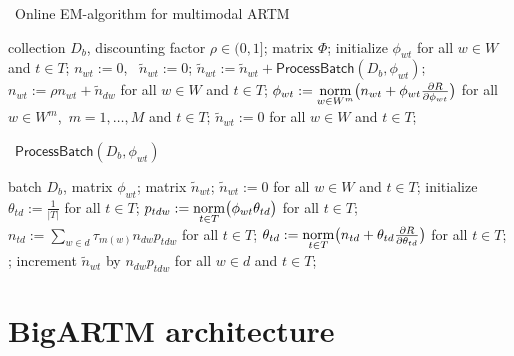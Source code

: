 \documentclass[russian]{llncs}
\newcommand{\norm}{\mathop{\rm norm}\limits}
\newcommand{\kw}[1]{\textsf{#1}}
\begin{document}
\begin{algorithm}[t]
\caption{~Online EM-algorithm for multimodal ARTM}
\label{alg:Online}
\begin{algorithmic}[1]
\REQUIRE collection $D_b$, discounting factor $\rho\in(0,1]$;
\ENSURE matrix $\Phi$;
\STATE initialize $\phi_{wt}$ for all $w \in W$ and $t \in T$;
\STATE $n_{wt} := 0$,~ $\tilde n_{wt} := 0$;
    \STATE $\tilde n_{wt} := \tilde n_{wt} + \kw{ProcessBatch}(D_b, \phi_{wt})$;
     \label{alg:sync}
        \STATE \label{alg:merging}
               $n_{wt} := \rho n_{wt} + \tilde n_{dw}$ for all $w \in W$ and $t \in T$;
        \STATE \label{alg:phi}
               $\phi_{wt} := \norm_{w\in W^m}
                    \bigl(
                        n_{wt} + \phi_{wt} \frac{\partial R}{\partial \phi_{wt}}
                    \bigr)$
               for all $w \in W^m$,\, $m=1,\dots,M$ and $t \in T$;
        \STATE $\tilde n_{wt} := 0$ for all $w \in W$ and $t \in T$;
    \ENDIF
\ENDFOR
\end{algorithmic}
\end{algorithm}

\begin{algorithm}[t]
\caption{~$\kw{ProcessBatch} (D_b, \phi_{wt})$}
\label{alg:ProcessBatch}
\begin{algorithmic}[1]
\REQUIRE batch $D_b$, matrix $\phi_{wt}$;
\ENSURE matrix $\tilde n_{wt}$;
\STATE $\tilde n_{wt} := 0$ for all $w \in W$ and $t \in T$;
	\STATE initialize $\theta_{td} := \frac{1}{|T|}$ for all $t \in T$;
	\REPEAT
        \STATE $p_{tdw} := \norm_{t\in T} \bigl(\phi_{wt}\theta_{td}\bigr)$ for all $t \in T$;
        \STATE $n_{td} := \sum_{w\in d} \tau_{m(w)} n_{dw} p_{tdw}$ for all $t \in T$;
        \STATE $\theta_{td} := \norm_{t\in T}
                    \bigl(
                        n_{td} + \theta_{td} \frac{\partial R}{\partial \theta_{td}}
                    \bigr)$ for all $t \in T$;
	;
	\STATE increment $\tilde n_{wt}$ by $n_{dw} p_{tdw}$ for all $w \in d$ and $t \in T$;
\ENDFOR
\end{algorithmic}
\end{algorithm}


\section{BigARTM architecture}
\label{sec:BigARTM}
\end{document}
